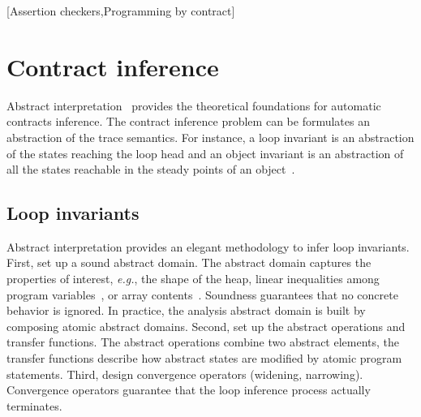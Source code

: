 \documentclass{sig-alternate-2013}
\begin{document}
\begin{abstract}
Contracts are a simple yet very powerful form of specification.
They  consists of method preconditions and postconditions, of object invariants, and of assertions and loop invariants.
Ideally, the programmer will annotate all of her code with contracts which are mechanically checked by some static analysis tool.
In practice, programmers only write few contracts, mainly preconditions and some object invariants.
The reason for that is that other contracts are ``clear from the code'':
Programmers do not like to repeat themselves.
As a consequence, any \emph{usable} static verification tool should provide some form of contract inference.
\end{abstract}

[Assertion checkers,Programming by contract]




\section{Contract inference}
Abstract interpretation~\cite{CousotCousot77} provides the theoretical foundations for automatic contracts inference.
The contract inference problem can be formulates an abstraction of the trace semantics.
For instance, a loop invariant is an abstraction of the states reaching the loop head and
an object invariant is an abstraction of all the states reachable in the steady points of an object~\cite{Logozzo09}.

\vfill\eject 
\subsection{Loop invariants}
Abstract interpretation provides an elegant methodology to infer loop invariants.
First, set up a sound abstract domain.
The abstract domain captures the properties of interest, \emph{e.g.}, the  shape of the heap, linear inequalities among program variables~\cite{subpolyhedra}, or array contents~\cite{arrayal}.
Soundness guarantees that no concrete behavior is ignored.
In practice, the analysis abstract domain is built by composing atomic abstract domains. 
Second, set up the abstract operations and transfer functions.
The abstract operations combine two abstract elements, the transfer functions describe how abstract states are modified by atomic program statements.
Third, design convergence operators (widening, narrowing).
Convergence operators guarantee that the loop inference process actually terminates.  
\end{document}
